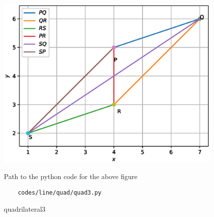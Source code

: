 \begin{figure}[!ht]
	\centering
	\includegraphics[width=\columnwidth]{./figures/line/quads/quad3.eps}
	\caption{quadrilateral3 }
	\label{fig:quadrilateral2}
	Path to the python code for the above figure
	\begin{lstlisting}
	codes/line/quad/quad3.py
	\end{lstlisting}
\end{figure}

